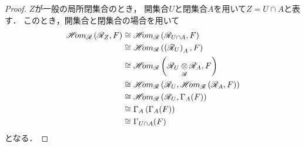 \begin{proof}
    \(Z\)が一般の局所閉集合のとき，
    開集合\(U\)と閉集合\(A\)を用いて\(Z=U\cap A\)と表す．
    このとき，開集合と閉集合の場合を用いて
    \begin{align*}
        \HOM_{\scR}\left(\scR_Z,F\right)
        &\cong
        \HOM_{\scR}\left(\scR_{U\cap A},F\right)\\
        &\cong
        \HOM_{\scR}\left(\left(\scR_{U}\right)_A,F\right)\\
        &\cong
        \HOM_{\scR}\left(\scR_{U}\ttens[\scR]\scR_A,F\right)\\
        &\cong
        \HOM_{\scR}\left(
            \scR_{U},\HOM_{\scR}\left(\scR_{A},F\right)
        \right)\\
        &\cong
        \HOM_{\scR}\left(\scR_{U},\Gamma_{A}(F)\right)\\
        &\cong
        \Gamma_{A}\left(\Gamma_{A}(F)\right)\\
        &\cong
        \Gamma_{U\cap A}(F)
    \end{align*}
    となる．
\end{proof}

